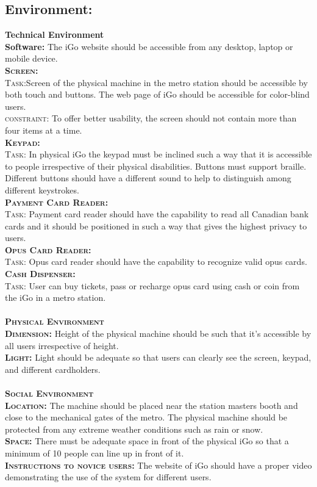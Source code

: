 \documentclass[a4paper, 11pt]{report}
\begin{document}
\subsection{Environment:}
\large{\textbf{Technical Environment}}\\
\large{\textbf{Software:} The iGo website should be accessible from any desktop, laptop or mobile device.  \\
\textsc{\large \bf Screen:}   \\
\textsc{\large Task:}Screen of the physical machine in the metro station should be accessible by both touch and buttons. The web page of iGo should be accessible for color-blind users. \\
\textsc{\large constraint:} To offer better usability, the screen should not contain more than four items at a time.\\
\textsc{\large \bf Keypad:} \\
\textsc{\large Task:} In physical iGo the keypad must be inclined such a way that it is accessible to people irrespective of their physical disabilities. Buttons must support braille. Different buttons should have a different sound to help to distinguish among different keystrokes. \\
\textsc{\large \bf Payment Card Reader:} \\
\textsc{\large Task:} Payment card reader should have the capability to read all Canadian bank cards and it should be positioned in such a way that gives the highest privacy to users.   \\
\textsc{\large \bf Opus Card Reader:} \\
\textsc{\large Task:} Opus card reader should have the capability to recognize valid opus cards.  \\
\textsc{\large \bf  Cash Dispenser:}\\
\textsc{\large Task:} User can buy tickets, pass or recharge opus card using cash or coin from the iGo in a metro station. \\\\
\textsc{\large \bf Physical Environment}\\
\textsc{\large \bf Dimension:} Height of the physical machine should be such that it's accessible by all users irrespective of height. \\
\textsc{\large \bf Light:} Light should be adequate so that users can clearly see the screen, keypad, and different cardholders. \\\\
\textsc{\large \bf Social Environment}\\
\textsc{\large \bf Location:} The machine should be placed near the station masters booth and close to the mechanical gates of the metro. The physical machine should be protected from any extreme weather conditions such as rain or snow. \\
\textsc{\large \bf Space:} There must be adequate space in front of the physical iGo so that a minimum of 10 people can line up in front of it. \\
\textsc{\large \bf  Instructions to novice users:} The website of iGo should have a proper video demonstrating the use of the system for different users.\\
}
\end{document}
